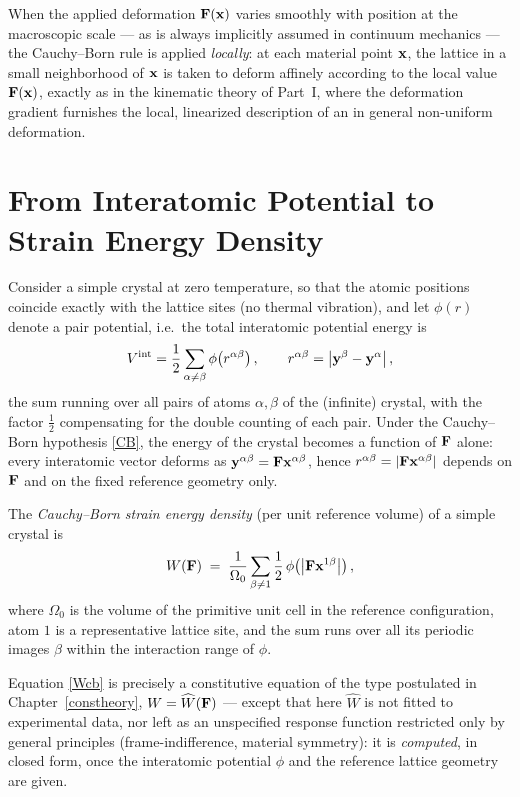 When the applied deformation $\mathbf{F}(\mathbf{x})$ varies smoothly with position at the macroscopic scale --- as is always implicitly assumed in continuum mechanics --- the Cauchy--Born rule is applied \textit{locally}: at each material point $\mathbf{x}$, the lattice in a small neighborhood of $\mathbf{x}$ is taken to deform affinely according to the local value $\mathbf{F}(\mathbf{x})$, exactly as in the kinematic theory of Part~I, where the deformation gradient furnishes the local, linearized description of an in general non-uniform deformation.

\section{From Interatomic Potential to Strain Energy Density}

Consider a simple crystal at zero temperature, so that the atomic positions coincide exactly with the lattice sites (no thermal vibration), and let $\phi(r)$ denote a pair potential, i.e.\ the total interatomic potential energy is
\begin{equation}
	V^{\rm int} = \frac{1}{2}\sum_{\alpha\neq\beta} \phi\!\left(r^{\alpha\beta}\right), \qquad r^{\alpha\beta} = \left|\mathbf{y}^\beta - \mathbf{y}^\alpha\right|,
\end{equation}
the sum running over all pairs of atoms $\alpha,\beta$ of the (infinite) crystal, with the factor $\tfrac12$ compensating for the double counting of each pair. Under the Cauchy--Born hypothesis \eqref{CB}, the energy of the crystal becomes a function of $\mathbf{F}$ alone: every interatomic vector deforms as $\mathbf{y}^{\alpha\beta} = \mathbf{F}\mathbf{x}^{\alpha\beta}$, hence $r^{\alpha\beta} = |\mathbf{F}\mathbf{x}^{\alpha\beta}|$ depends on $\mathbf{F}$ and on the fixed reference geometry only.

\begin{definition}
	The \textit{Cauchy--Born strain energy density} (per unit reference volume) of a simple crystal is
	\begin{equation}\label{Wcb}
		W(\mathbf{F}) \;=\; \frac{1}{\Omega_0}\sum_{\beta\neq 1}^{} \frac{1}{2}\,\phi\!\left(\left|\mathbf{F}\mathbf{x}^{1\beta}\right|\right),
	\end{equation}
	where $\Omega_0$ is the volume of the primitive unit cell in the reference configuration, atom $1$ is a representative lattice site, and the sum runs over all its periodic images $\beta$ within the interaction range of $\phi$.
\end{definition}

Equation \eqref{Wcb} is precisely a constitutive equation of the type postulated in Chapter~\ref{constheory}, $W=\widehat W(\mathbf{F})$ --- except that here $\widehat W$ is not fitted to experimental data, nor left as an unspecified response function restricted only by general principles (frame-indifference, material symmetry): it is \textit{computed}, in closed form, once the interatomic potential $\phi$ and the reference lattice geometry are given.

